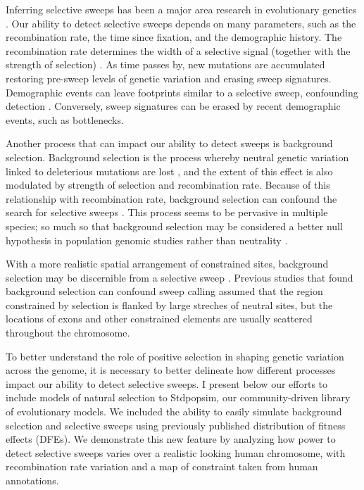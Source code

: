 Inferring selective sweeps has been a major area research in evolutionary genetics \citep{nielsen_estimation_2000, hernandez_classic_2011, garud_recent_2015, schrider_soft_2017, przeworski_signature_2002, enard_genome-wide_2014, williamson_evidence_2014}.
Our ability to detect selective sweeps depends on many parameters, such as the recombination rate, the time since fixation, and the demographic history.
The recombination rate determines the width of a selective signal (together with the strength of selection) \citep{kaplan_hitchhiking_1989}.
As time passes by, new mutations are accumulated restoring pre-sweep levels of genetic variation and erasing sweep signatures.
Demographic events can leave footprints similar to a selective sweep, confounding detection \citep{przeworski_signature_2002, jensen_distinguishing_2005}.
Conversely, sweep signatures can be erased by recent demographic events, such as bottlenecks.

Another process that can impact our ability to detect sweeps is background selection.
Background selection is the process whereby neutral genetic variation linked to deleterious mutations are lost \citep{charlesworth_effect_1993}, and the extent of this effect is also modulated by strength of selection and recombination rate.
Because of this relationship with recombination rate, background selection can confound the search for selective sweeps \citep{andolfatto_adaptive_2001}.
This process seems to be pervasive in multiple species; so much so that background selection may be considered a better null hypothesis in population genomic studies rather than neutrality \citep{comeron_background_2017}.

With a more realistic spatial arrangement of constrained sites, background selection may be discernible from a selective sweep \citep{schrider_background_2020}.
Previous studies that found background selection can confound sweep calling assumed that the region constrained by selection is flanked by large streches of neutral sites,
but the locations of exons and other constrained elements are usually scattered throughout the chromosome.

To better understand the role of positive selection in shaping genetic variation across the genome,
it is necessary to better delineate how different processes impact our ability to detect selective sweeps.
I present  below our efforts to include models of natural selection to Stdpopsim, our community-driven library of evolutionary models.
We included the ability to easily simulate background selection and selective sweeps using previously published distribution of fitness effects (DFEs).
We demonstrate this new feature by analyzing how power to detect selective sweeps varies over a realistic looking human chromosome, with recombination rate variation and a map of constraint taken from human annotations.

